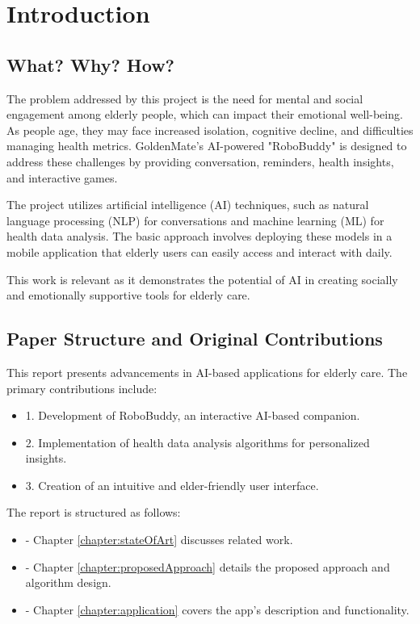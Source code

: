 \documentclass[runningheads,a4paper,11pt]{report}
\begin{document}
\newpage



\chapter{Introduction}
\label{chapter:introduction}

\section{What? Why? How?}
\label{section:what}

The problem addressed by this project is the need for mental and social engagement among elderly people, which can impact their emotional well-being. As people age, they may face increased isolation, cognitive decline, and difficulties managing health metrics. GoldenMate's AI-powered "RoboBuddy" is designed to address these challenges by providing conversation, reminders, health insights, and interactive games.

The project utilizes artificial intelligence (AI) techniques, such as natural language processing (NLP) for conversations and machine learning (ML) for health data analysis. The basic approach involves deploying these models in a mobile application that elderly users can easily access and interact with daily.

This work is relevant as it demonstrates the potential of AI in creating socially and emotionally supportive tools for elderly care.

\section{Paper Structure and Original Contributions}
\label{section:structure}

This report presents advancements in AI-based applications for elderly care. The primary contributions include:
\begin{itemize}
    \item 1. Development of RoboBuddy, an interactive AI-based companion.
    \item 2. Implementation of health data analysis algorithms for personalized insights.
    \item 3. Creation of an intuitive and elder-friendly user interface.
\end{itemize}

The report is structured as follows:
\begin{itemize}
    \item - Chapter \ref{chapter:stateOfArt} discusses related work.
    \item - Chapter \ref{chapter:proposedApproach} details the proposed approach and algorithm design.
    \item - Chapter \ref{chapter:application} covers the app's description and functionality.
\end{itemize}
\end{document}
